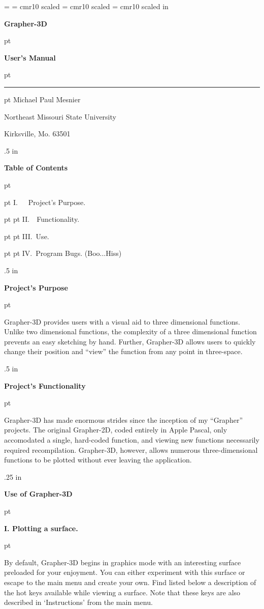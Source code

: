 \magnification = 
\font\bigrm = cmr10 scaled 
\font\medium = cmr10 scaled 
\font\small  = cmr10 scaled 
\nopagenumbers
{} in

\centerline{\bf \bigrm Grapher-3D}
 pt
\centerline{\bf \medium User's Manual}

 pt

\hrule
{} pt
\small Michael Paul Mesnier

\small Northeast Missouri State University

\small Kirksville, Mo. 63501

\vfill
\eject
\vglue .5 in
\centerline{\bf \bigrm Table of Contents}                               
 pt

              pt I.~~~Project's Purpose.
                          
 pt  pt II.~~Functionality.

 pt  pt III.~Use.

 pt  pt IV.~Program Bugs. (Boo...Hiss)

\vfill
\eject
\vglue .5 in
\centerline{\bf \bigrm Project's Purpose}
 pt

Grapher-3D provides users with a visual aid to three dimensional 
functions.  Unlike two dimensional functions, the complexity of a three 
dimensional function prevents an easy sketching by hand.  
Further, Grapher-3D allows users to quickly change their 
position and ``view'' the function from any point in three-space.

\vfill
\eject
\vglue .5 in
\centerline{\bf \bigrm Project's Functionality}                           
 pt

Grapher-3D has made enormous strides since the inception of 
my ``Grapher'' projects.  The original Grapher-2D, coded entirely 
in Apple Pascal, only accomodated a single, hard-coded function,  
and viewing new functions necessarily required recompilation.  
Grapher-3D, however, allows numerous three-dimensional functions 
to be plotted without ever leaving the application.
      
\vfill
\eject
\vglue .25 in
\centerline{\bf \bigrm Use of Grapher-3D}
 pt
\centerline{\bf I. Plotting a surface.}
 pt

By default, Grapher-3D begins in graphics mode with an 
interesting surface preloaded for your enjoyment.  You can 
either experiment with this surface or escape to the main 
menu and create your own.  Find listed below a description 
of the hot keys available while viewing a surface.  Note that
these keys are also described in `Instructions' from the main
menu.

